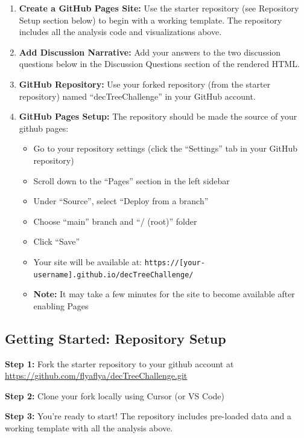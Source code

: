 \documentclass[
  letterpaper,
  DIV=11,
  numbers=noendperiod]{scrartcl}
\providecommand{\tightlist}{%
  \setlength{\itemsep}{0pt}\setlength{\parskip}{0pt}}
\begin{document}
\begin{enumerate}
\def\labelenumi{\arabic{enumi}.}
\item
  \textbf{Create a GitHub Pages Site:} Use the starter repository (see
  Repository Setup section below) to begin with a working template. The
  repository includes all the analysis code and visualizations above.
\item
  \textbf{Add Discussion Narrative:} Add your answers to the two
  discussion questions below in the Discussion Questions section of the
  rendered HTML.
\item
  \textbf{GitHub Repository:} Use your forked repository (from the
  starter repository) named ``decTreeChallenge'' in your GitHub account.
\item
  \textbf{GitHub Pages Setup:} The repository should be made the source
  of your github pages:

  \begin{itemize}
  \tightlist
  \item
    Go to your repository settings (click the ``Settings'' tab in your
    GitHub repository)
  \item
    Scroll down to the ``Pages'' section in the left sidebar
  \item
    Under ``Source'', select ``Deploy from a branch''
  \item
    Choose ``main'' branch and ``/ (root)'' folder
  \item
    Click ``Save''
  \item
    Your site will be available at:
    \texttt{https://{[}your-username{]}.github.io/decTreeChallenge/}
  \item
    \textbf{Note:} It may take a few minutes for the site to become
    available after enabling Pages
  \end{itemize}
\end{enumerate}

\subsection{Getting Started: Repository Setup
🚀}\label{getting-started-repository-setup}

\begin{tcolorbox}[enhanced jigsaw, colbacktitle=quarto-callout-important-color!10!white, toptitle=1mm, colframe=quarto-callout-important-color-frame, breakable, rightrule=.15mm, arc=.35mm, bottomtitle=1mm, titlerule=0mm, opacityback=0, title=\textcolor{quarto-callout-important-color}{\faExclamation}\hspace{0.5em}{📁 Quick Start with Starter Repository}, colback=white, bottomrule=.15mm, toprule=.15mm, leftrule=.75mm, coltitle=black, opacitybacktitle=0.6, left=2mm]

\textbf{Step 1:} Fork the starter repository to your github account at
\url{https://github.com/flyaflya/decTreeChallenge.git}

\textbf{Step 2:} Clone your fork locally using Cursor (or VS Code)

\textbf{Step 3:} You're ready to start! The repository includes
pre-loaded data and a working template with all the analysis above.

\end{tcolorbox}
\end{document}
